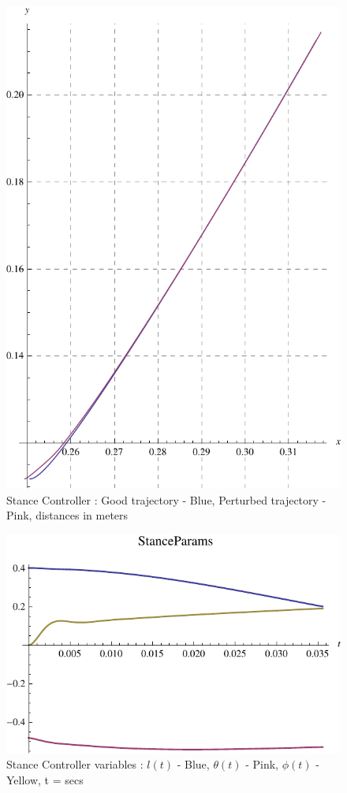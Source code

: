 \begin{enumerate}
\begin{figure}[!htp]
  \includegraphics[scale=1]{fig/pStance_trajec_control.pdf}
  \caption{Stance Controller : Good trajectory - Blue, Perturbed trajectory - Pink, distances in meters}
  \label{fig:4_stance_control_trajec}
  \end{figure}

  \begin{figure}[!htp]
  \centering
  \includegraphics[scale=1]{fig/pStance_params_control.pdf}
  \caption{Stance Controller variables : $l(t)$ - Blue, $\theta(t)$ - Pink, $\phi(t)$ - Yellow, t = secs}
  \label{fig:4_stance_control_var}
  \end{figure}


\end{enumerate}
